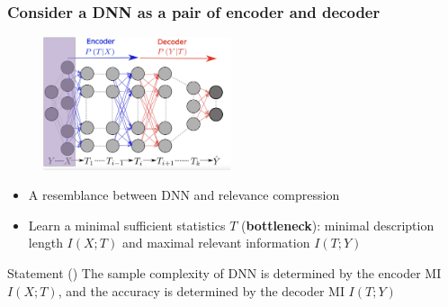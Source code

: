 \documentclass{beamer}
\begin{document}
\begin{frame}
    \frametitle{Consider a DNN as a pair of encoder and decoder}
    \begin{figure}
        \centering
        \includegraphics[width=5.5cm]{IB_encoder_decoder.jpg}
    \end{figure}
    \vspace{-0.2cm}
    \begin{itemize}
        \item A resemblance between DNN and relevance compression
        \item Learn a minimal sufficient statistics $T$ (\textbf{bottleneck}): minimal description length $I(X;T)$ and maximal relevant information $I(T;Y)$
    \end{itemize}
    \vspace{-0.2cm}
    \begin{block}{Statement (\cite{IB-DNN})}
        The sample complexity of DNN is determined by the encoder MI $I(X;T)$, and the accuracy is determined by the decoder MI $I(T;Y)$
    \end{block}
\end{frame}
\end{document}
